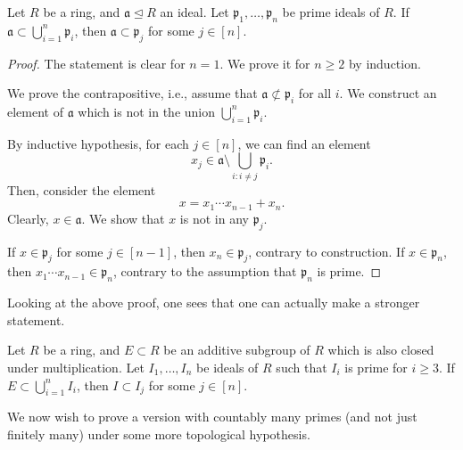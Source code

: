 \begin{thm}
	Let $R$ be a ring, and $\mathfrak{a} \unlhd R$ an ideal. Let $\mathfrak{p}_{1}, \ldots, \mathfrak{p}_{n}$ be prime ideals of $R$. If $\mathfrak{a} \subset \bigcup_{i = 1}^{n} \mathfrak{p}_{i}$, then $\mathfrak{a} \subset \mathfrak{p}_{j}$ for some $j \in [n]$.
\end{thm}
\begin{proof} 
	The statement is clear for $n = 1$. We prove it for $n \ge 2$ by induction.

	We prove the contrapositive, i.e., assume that $\mathfrak{a} \not\subset \mathfrak{p}_{i}$ for all $i$. We construct an element of $\mathfrak{a}$ which is not in the union $\bigcup_{i = 1}^{n} \mathfrak{p}_{i}$. 

	By inductive hypothesis, for each $j \in [n]$, we can find an element 
	\begin{equation*} 
		x_{j} \in \mathfrak{a} \setminus \bigcup_{i : i \neq j} \mathfrak{p}_{i}.
	\end{equation*}
	Then, consider the element
	\begin{equation*} 
		x = x_{1} \cdots x_{n - 1} + x_{n}.
	\end{equation*}
	Clearly, $x \in \mathfrak{a}$. We show that $x$ is not in any $\mathfrak{p}_{j}$.

	If $x \in \mathfrak{p}_{j}$ for some $j \in [n - 1]$, then $x_{n} \in \mathfrak{p}_{j}$, contrary to construction. \newline
	If $x \in \mathfrak{p}_{n}$, then $x_{1} \cdots x_{n - 1} \in \mathfrak{p}_{n}$, contrary to the assumption that $\mathfrak{p}_{n}$ is prime.
\end{proof}

Looking at the above proof, one sees that one can actually make a stronger statement.

\begin{por}
	Let $R$ be a ring, and $E \subset R$ be an additive subgroup of $R$ which is also closed under multiplication. \newline
	Let $I_{1}, \ldots, I_{n}$ be ideals of $R$ such that $I_{i}$ is prime for $i \ge 3$. \newline
	If $E \subset \bigcup_{i = 1}^{n} I_{i}$, then $I \subset I_{j}$ for some $j \in [n]$.
\end{por}

We now wish to prove a version with countably many primes (and not just finitely many) under some more topological hypothesis. 


